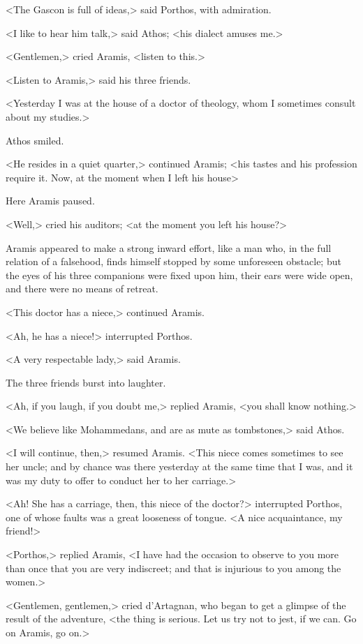 <The Gascon is full of ideas,> said Porthos, with admiration. 

<I like to hear him talk,> said Athos; <his dialect amuses me.> 

<Gentlemen,> cried Aramis, <listen to this.> 

<Listen to Aramis,> said his three friends. 

<Yesterday I was at the house of a doctor of theology, whom I sometimes consult about my studies.> 

Athos smiled. 

<He resides in a quiet quarter,> continued Aramis; <his tastes and his profession require it. Now, at the moment when I left his house\longdash> 

Here Aramis paused. 

<Well,> cried his auditors; <at the moment you left his house?> 

Aramis appeared to make a strong inward effort, like a man who, in the full relation of a falsehood, finds himself stopped by some unforeseen obstacle; but the eyes of his three companions were fixed upon him, their ears were wide open, and there were no means of retreat. 

<This doctor has a niece,> continued Aramis. 

<Ah, he has a niece!> interrupted Porthos. 

<A very respectable lady,> said Aramis. 

The three friends burst into laughter. 

<Ah, if you laugh, if you doubt me,> replied Aramis, <you shall know nothing.> 

<We believe like Mohammedans, and are as mute as tombstones,> said Athos. 

<I will continue, then,> resumed Aramis. <This niece comes sometimes to see her uncle; and by chance was there yesterday at the same time that I was, and it was my duty to offer to conduct her to her carriage.> 

<Ah! She has a carriage, then, this niece of the doctor?> interrupted Porthos, one of whose faults was a great looseness of tongue. <A nice acquaintance, my friend!> 

<Porthos,> replied Aramis, <I have had the occasion to observe to you more than once that you are very indiscreet; and that is injurious to you among the women.> 

<Gentlemen, gentlemen,> cried d'Artagnan, who began to get a glimpse of the result of the adventure, <the thing is serious. Let us try not to jest, if we can. Go on Aramis, go on.> 

